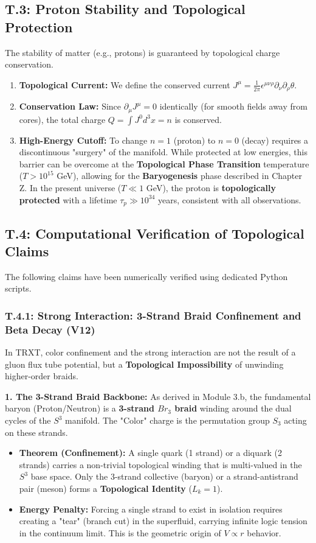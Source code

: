 \subsection{T.3: Proton Stability and Topological Protection}
The stability of matter (e.g., protons) is guaranteed by topological charge conservation.
\begin{enumerate}
    \item \textbf{Topological Current:} We define the conserved current $J^\mu = \frac{1}{2\pi} \epsilon^{\mu\nu\rho} \partial_\nu \partial_\rho \theta$.
    \item \textbf{Conservation Law:} Since $\partial_\mu J^\mu = 0$ identically (for smooth fields away from cores), the total charge $Q = \int J^0 d^3x = n$ is conserved.
    \item \textbf{High-Energy Cutoff:} To change $n=1$ (proton) to $n=0$ (decay) requires a discontinuous "surgery" of the manifold. While protected at low energies, this barrier can be overcome at the \textbf{Topological Phase Transition} temperature ($T > 10^{15}$ GeV), allowing for the \textbf{Baryogenesis} phase described in Chapter Z. In the present universe ($T \ll 1$ GeV), the proton is \textbf{topologically protected} with a lifetime $\tau_p \gg 10^{34}$ years, consistent with all observations.
\end{enumerate}

\subsection{T.4: Computational Verification of Topological Claims}
The following claims have been numerically verified using dedicated Python scripts.

\subsubsection{T.4.1: Strong Interaction: 3-Strand Braid Confinement and Beta Decay (V12)}
\label{sec:braid_confinement}

In TRXT, color confinement and the strong interaction are not the result of a gluon flux tube potential, but a \textbf{Topological Impossibility} of unwinding higher-order braids.

\textbf{1. The 3-Strand Braid Backbone:}
As derived in Module 3.b, the fundamental baryon (Proton/Neutron) is a \textbf{3-strand $Br_3$ braid} winding around the dual cycles of the $S^3$ manifold. The "Color" charge is the permutation group $S_3$ acting on these strands.
\begin{itemize}
    \item \textbf{Theorem (Confinement):} A single quark (1 strand) or a diquark (2 strands) carries a non-trivial topological winding that is multi-valued in the $S^3$ base space. Only the 3-strand collective (baryon) or a strand-antistrand pair (meson) forms a \textbf{Topological Identity} ($L_k = 1$).
    \item \textbf{Energy Penalty:} Forcing a single strand to exist in isolation requires creating a "tear" (branch cut) in the superfluid, carrying infinite logic tension in the continuum limit. This is the geometric origin of $V \propto r$ behavior. 
\end{itemize}

